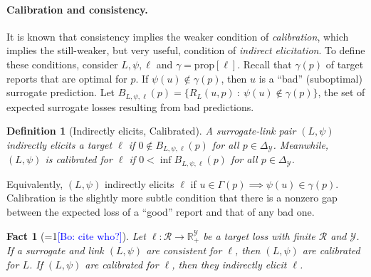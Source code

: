 \documentclass{article}
\newtheorem{fact}{Fact}
\newtheorem{definition}{Definition}
\newcommand{\Comments}{1}
\newcommand{\mynote}[2]{\ifnum\Comments=1\textcolor{#1}{#2}\fi}
\newcommand{\bo}[1]{\mynote{blue}{[Bo: #1]}}
\newcommand{\reals}{\mathbb{R}}
\newcommand{\prop}[1]{\mathrm{prop}[#1]}
\newcommand{\simplex}{\Delta_\Y}
\newcommand{\R}{\mathcal{R}}
\newcommand{\Y}{\mathcal{Y}}
\newcommand{\risk}[1]{\underline{#1}}
\newcommand{\inprod}[2]{\langle #1, #2 \rangle}%
\begin{document}
\paragraph{Calibration and consistency.}
It is known that consistency implies the weaker condition of \emph{calibration}, which implies the still-weaker, but very useful, condition of \emph{indirect elicitation}.
To define these conditions, consider $L,\psi,\ell$ and $\gamma = \prop{\ell}$.
Recall that $\gamma(p)$ of target reports that are optimal for $p$.
If $\psi(u) \not\in \gamma(p)$, then $u$ is a ``bad'' (suboptimal) surrogate prediction.
Let $B_{L,\psi,\ell}(p) = \{R_L(u,p) ~:~ \psi(u) \not\in \gamma(p)\}$, the set of expected surrogate losses resulting from bad predictions.
\begin{definition}[Indirectly elicits, Calibrated]
  A surrogate-link pair $(L,\psi)$ \emph{indirectly elicits} a target $\ell$ if $0 \not\in B_{L,\psi,\ell}(p)$ for all $p \in \simplex$.
  Meanwhile, $(L,\psi)$ is \emph{calibrated} for $\ell$ if $0 < \inf B_{L,\psi,\ell}(p)$ for all $p \in \simplex$.
\end{definition}
Equivalently, $(L,\psi)$ indirectly elicits $\ell$ if $u \in \Gamma(p) \implies \psi(u) \in \gamma(p)$.
Calibration is the slightly more subtle condition that there is a nonzero gap between the expected loss of a ``good'' report and that of any bad one.
\begin{fact}[\bo{cite who?}]
  \label{fact:consistent-calibrated-elicits}
  Let $\ell: \R \to \reals_+^{\Y}$ be a target loss with finite $\R$ and $\Y$.
  If a surrogate and link $(L,\psi)$ are consistent for $\ell$, then $(L,\psi)$ are calibrated for $L$.
  If $(L,\psi)$ are calibrated for $\ell$, then they indirectly elicit $\ell$.
\end{fact}

\end{document}
